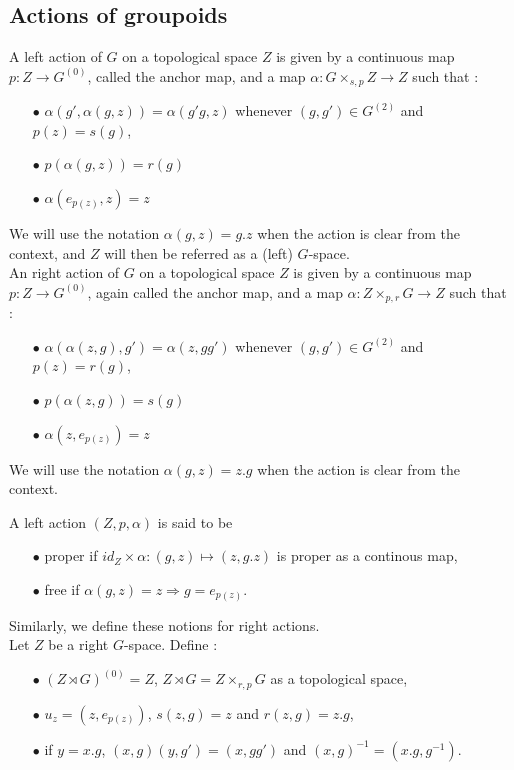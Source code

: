 \subsection{Actions of groupoids}

\begin{definition}
A left action of $G$ on a topological space $Z$ is given by a continuous map $p : Z \rightarrow G^{(0)}$, called the anchor map, and a map $\alpha : G\times_{s,p} Z \rightarrow Z $ such that :
\begin{itemize}
\item[$\bullet$] $\alpha(g',\alpha(g,z)) = \alpha(g'g,z)$ whenever $(g,g')\in G^{(2)}$ and $p(z)=s(g)$,
\item[$\bullet$] $p(\alpha(g,z))= r(g)$
\item[$\bullet$] $\alpha(e_{p(z)},z)=z$
\end{itemize} 
We will use the notation $\alpha(g,z) = g.z$ when the action is clear from the context, and $Z$ will then be referred as a (left) $G$-space.\\

An right action of $G$ on a topological space $Z$ is given by a continuous map $p : Z \rightarrow G^{(0)}$, again called the anchor map, and a map $\alpha : Z\times_{p,r} G \rightarrow Z $ such that :
\begin{itemize}
\item[$\bullet$] $\alpha(\alpha(z,g),g') = \alpha(z, gg')$ whenever $(g,g')\in G^{(2)}$ and $p(z)=r(g)$,
\item[$\bullet$] $p(\alpha(z,g))= s(g)$
\item[$\bullet$] $\alpha(z,e_{p(z)})=z$
\end{itemize} We will use the notation $\alpha(g,z) = z.g$ when the action is clear from the context.\\ 
\end{definition}

A left action $(Z,p,\alpha)$ is said to be 
\begin{itemize}
\item[$\bullet$] proper if $id_Z \times \alpha : (g,z) \mapsto (z,g.z) $ is proper as a continous map,
\item[$\bullet$] free if $\alpha(g,z)=z \Rightarrow g=e_{p(z)} $.
\end{itemize}
Similarly, we define these notions for right actions.\\

Let $Z$ be a right $G$-space. Define :
\begin{itemize}
\item[$\bullet$] $(Z\rtimes G)^{(0)} = Z$, $Z\rtimes G = Z\times_{r,p} G$ as a topological space,
\item[$\bullet$] $u_{z}= (z,e_{p(z)})$, $ s(z,g) = z$ and $r(z,g)=z.g$, 
\item[$\bullet$] if $y = x.g$, $(x,g)(y,g')= (x,gg') $ and $(x,g)^{-1} = (x.g,g^{-1})$.
\end{itemize}

